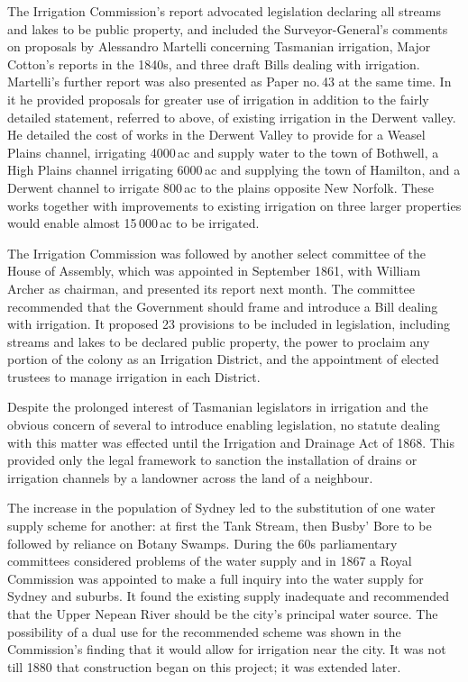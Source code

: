 The Irrigation Commission's report advocated legislation declaring all
streams and lakes to be public property, and included the
Surveyor-General's comments on proposals by Alessandro Martelli
concerning Tasmanian irrigation, Major Cotton's reports in the 1840s,
and three draft Bills dealing with irrigation.  Martelli's further
report was also presented as Paper no.\,43 at the same time.  In it he
provided proposals for greater use of irrigation in addition to the
fairly detailed statement, referred to above, of existing irrigation
in the Derwent valley.  He detailed the cost of works in the Derwent
Valley to provide for a Weasel Plains channel, irrigating 4000\,ac and
supply water to the town of Bothwell, a High Plains channel irrigating
6000\,ac and supplying the town of Hamilton, and a Derwent channel to
irrigate 800\,ac to the plains opposite New Norfolk.  These works
together with improvements to existing irrigation on three larger
properties would enable almost 15\,000\,ac to be irrigated.

The Irrigation Commission was followed by another select committee of
the House of Assembly, which was appointed in September 1861, with
William Archer as chairman, and presented its report next month.  The
committee recommended that the Government should frame and introduce a
Bill dealing with irrigation. It proposed 23 provisions to be included
in legislation, including streams and lakes to be declared public
property, the power to proclaim any portion of the colony as an
Irrigation District, and the appointment of elected trustees to manage
irrigation in each District.\fn{Tas.\ HA Paper no.\,112 of 1861.}

Despite the prolonged interest of Tasmanian legislators in irrigation
and the obvious concern of several to introduce enabling legislation,
no statute dealing with this matter was effected until the Irrigation
and Drainage Act of 1868.  This provided only the legal framework to
sanction the installation of drains or irrigation channels by a
landowner across the land of a
neighbour.

The increase in the population of Sydney led to the substitution of
one water supply scheme for another: at first the Tank Stream, then
Busby' Bore to be followed by reliance on Botany Swamps.  During the
60s parliamentary committees considered problems of the water supply
and in 1867 a Royal Commission was appointed to make a full inquiry
into the water supply for Sydney and suburbs.  It found the existing
supply inadequate and recommended that the Upper Nepean River should
be the city's principal water source.  The possibility of a dual use
for the recommended scheme was shown in the Commission's finding that
it would allow for irrigation near the city.  It was not till 1880
that construction began on this project; it was extended
later.

